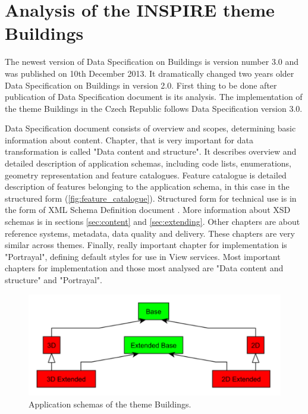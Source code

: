 \documentclass[eprint]{actapoly}
\begin{document}
\section{Analysis of the INSPIRE theme Buildings}
\label{sec:analysis}

The newest version of Data Specification on Buildings is version number 3.0 and was published on 10th December 2013. It dramatically changed two years older Data Specification on Buildings in version 2.0. First thing to be done after publication of Data Specification document is its analysis. The implementation of the theme Buildings in the Czech Republic follows Data Specification version 3.0.

Data Specification document consists of overview and scopes, determining basic information about content. Chapter, that is very important for data transformation is called "Data content and structure". It describes overview and detailed description of application schemas, including code lists, enumerations, geometry representation and feature catalogues. Feature catalogue is detailed description of features belonging to the application schema, in this case in the structured form (\ref{fig:feature_catalogue}). Structured form for technical use is in the form of XML Schema Definition document \cite{XSD}. More information about XSD schemas is in sections \ref{sec:content} and \ref{sec:extending}. Other chapters are about reference systems, metadata, data quality and delivery. These chapters are very similar across themes. Finally, really important  chapter for implementation is "Portrayal", defining default styles for use in View services. Most important chapters for implementation and those most analysed are "Data content and structure" and "Portrayal".

\begin{figure}
\centering
\includegraphics[width=0.8\linewidth]{pics/BU_schemas.pdf} %
\caption{Application schemas of the theme Buildings.}
\label{fig:building_schemas}
\end{figure}
\end{document}
